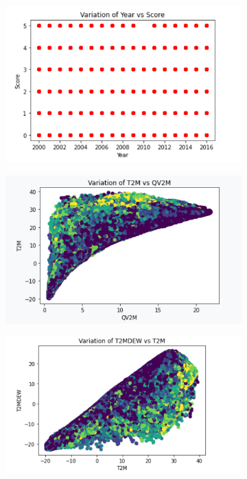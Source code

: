\documentclass{article}
\begin{document}
\begin{figure}[htbp]
\centering
    \begin{subfigure}{0.3\textwidth}
        \centering
        \includegraphics[width=\linewidth]{pic/scatter/Variance of Score vs Year.png}
    \end{subfigure}
    \begin{subfigure}{0.3\textwidth}
        \centering
        \includegraphics[width=\linewidth]{pic/scatter/Variance of T2M VS QV2M.png}
    \end{subfigure}
    \begin{subfigure}{0.3\textwidth}
        \centering
        \includegraphics[width=\linewidth]{pic/scatter/VARIANCE OF T2MDEW VS T2M .png}

\end{subfigure}
\end{figure}
\end{document}
